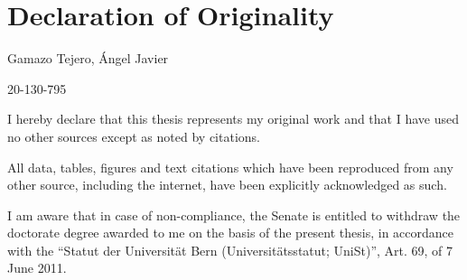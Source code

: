 \chapter*{Declaration of Originality}

{\setlength{\parskip}{10pt}
 Gamazo Tejero, Ángel Javier

 20-130-795
}

\vspace{1cm}

{\setlength{\parskip}{10pt}
\noindent I hereby declare that this thesis represents my original work and that I have used no other sources except as noted by citations.

\noindent All data, tables, figures and text citations which have been reproduced from any other source, including the internet, have been explicitly acknowledged as such.

\noindent I am aware that in case of non-compliance, the Senate is entitled to withdraw the doctorate degree awarded to me on the basis of the present thesis, in accordance with the “Statut der Universität Bern (Universitätsstatut; UniSt)”, Art. 69, of 7 June 2011.
}
\vspace{1cm}

 \vspace{1cm}
 